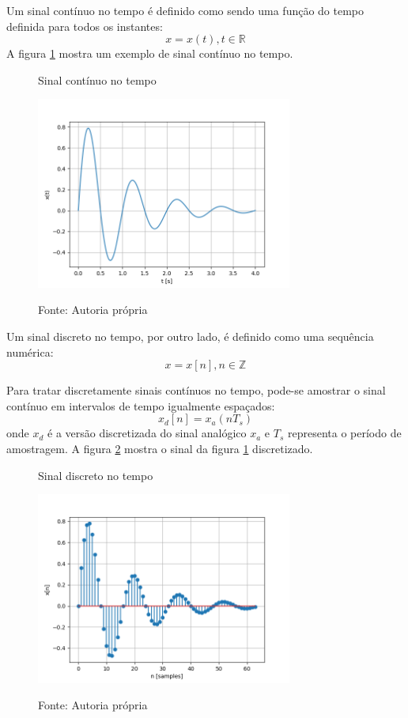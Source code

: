 \documentclass[12pt,a4paper]{report}
\begin{document}
  Um sinal contínuo no tempo é definido como sendo uma função do tempo definida para todos os instantes:
  \begin{equation}
    x = x(t), t \in \mathbb{R}
  \end{equation}
  A figura \ref{fig:continuous} mostra um exemplo de sinal contínuo no tempo.
  \begin{figure}
    \caption{Sinal contínuo no tempo}
    \centering
    \includegraphics[width=0.75\textwidth]{continuous}
    \label{fig:continuous}
    \caption*{Fonte: Autoria própria}
  \end{figure}

  Um sinal discreto no tempo, por outro lado, é definido como uma sequência numérica:
  \begin{equation}
    x = x[n], n \in \mathbb{Z}
  \end{equation}

  Para tratar discretamente sinais contínuos no tempo, pode-se amostrar o sinal contínuo em intervalos de tempo
  igualmente espaçados:
  \begin{equation}
    x_d[n] = x_a(n T_s)
  \end{equation}
  onde $x_d$ é a versão discretizada do sinal analógico $x_a$ e $T_s$ representa o período de amostragem.
  A figura \ref{fig:discrete} mostra o sinal da figura \ref{fig:continuous} discretizado.
  \begin{figure}
    \caption{Sinal discreto no tempo}
    \centering
    \includegraphics[width=0.75\textwidth]{discrete}
    \label{fig:discrete}
    \caption*{Fonte: Autoria própria}
  \end{figure}
\end{document}
